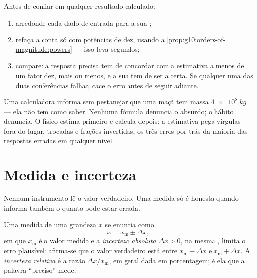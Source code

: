 \begin{method}\label{met:g10:orders-of-magnitude:sanity}
Antes de confiar em qualquer resultado calculado:
\begin{enumerate}
  \item arredonde cada dado de entrada para a sua ;
  \item refaça a conta só com potências de dez, usando a
        \cref{prop:g10:orders-of-magnitude:powers} --- isso leva
        segundos;
  \item compare: a resposta precisa tem de concordar com a estimativa a
        menos de um fator dez, mais ou menos, e a sua  tem de ser
        a certa. Se qualquer uma das duas conferências falhar, cace o
        erro antes de seguir adiante.
\end{enumerate}
\end{method}

\begin{remark}\label{rem:g10:orders-of-magnitude:sanity}
Uma calculadora informa sem pestanejar que uma maçã tem massa
$\qty{4e8}{kg}$ --- ela não tem como saber. Nenhuma fórmula denuncia o
absurdo; o hábito denuncia. O físico estima primeiro e calcula depois: a
estimativa pega vírgulas fora do lugar,  trocadas e frações
invertidas, os três erros por trás da maioria das respostas erradas em
qualquer nível.
\end{remark}

\section{Medida e incerteza}

Nenhum instrumento lê o valor verdadeiro. Uma medida só é honesta quando
informa também o quanto pode estar errada.

\begin{definition}\label{def:g10:orders-of-magnitude:uncertainty}
Uma medida de uma grandeza $x$ se enuncia como
\[
x = x_{\text{m}} \pm \Delta x ,
\]
em que $x_{\text{m}}$ é o valor medido e a \emph{incerteza
absoluta} $\Delta x > 0$, na mesma ,
limita o erro plausível: afirma-se que o valor verdadeiro está entre
$x_{\text{m}} - \Delta x$ e $x_{\text{m}} + \Delta x$. A \emph{incerteza
relativa} é a razão $\Delta x / x_{\text{m}}$,
em geral dada em porcentagem; é ela que a palavra ``preciso'' mede.
\end{definition}

